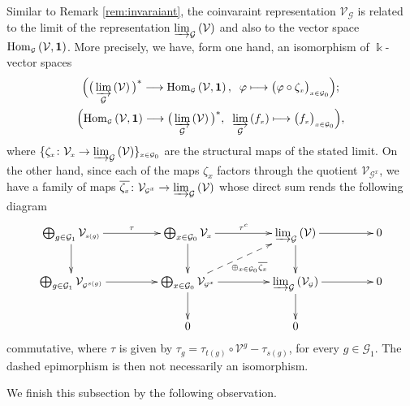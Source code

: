 \documentclass[11pt]{article}
\numberwithin{equation}{section}
\renewcommand{\hom}[3]{\mathrm{Hom}_{\Sscript{#1}}\left(#2, #3\right)}
\newcommand{\bara}[1]{\overline{#1}}
\newcommand{\Go}{\cG_{\Sscript{0}}}
\newcommand{\Ga}{\cG_{\Sscript{1}}}
\newcommand{\cG}{{\mathcal G}}
\newcommand{\cV}{{\mathcal V}}
\newcommand{\Sscript}[1]{\scriptscriptstyle{#1}}
\newcommand{\injlimit}[2]{\varinjlim_{#1}\left({#2}\right)}
\begin{document}
\begin{Remark}\label{rem:coinv}Similar to Remark \ref{rem:invaraiant}, the coinvaraint representation $\cV_{\Sscript{\cG}}$ is related to the limit of the representation $\injlimit{\cG}{\cV}$ and also to the vector space
$\hom{\cG}{\cV}{\bf 1}$. More precisely, we have, form one hand, an isomorphism of $\Bbbk$-vector spaces
\begin{gather*}
\Big(\big(\injlimit{\cG}{\cV} \big)^* \longrightarrow
\hom{\cG}{\cV}{\bf 1}, \;\; \varphi \longmapsto \big( \varphi \circ
\zeta_{\Sscript{x}}\big)_{\Sscript{x \in \Go}} \Big); \\ \Big(
\hom{\cG}{\cV}{\bf 1} \longrightarrow \big(\injlimit{\cG}{\cV}
\big)^*,\;\;\injlimit{\cG}{f_{\Sscript{x}}} \longmapsto \big(
f_{\Sscript{x}}\big)_{\Sscript{x \in \Go}}\Big),
\end{gather*}
where $\{\zeta_{\Sscript{x}}\colon \cV_{\Sscript{x}} \to \injlimit{\cG}{\cV}\}_{\Sscript{x \in \Go}}$ are the structural maps of the stated limit. On the other hand, since each of the maps $\zeta_{\Sscript{x}}$ factors through the quotient $\cV_{\Sscript{\cG^x}}$, we have a family of maps $\bara{\zeta_{\Sscript{x}}}\colon \cV_{\Sscript{\cG^x}} \to \injlimit{\cG}{\cV}$ whose direct sum rends the following diagram
\begin{gather*}
\xymatrix@C=45pt{ \bigoplus_{g \in \Ga} \cV_{\Sscript{s(g)}}
\ar@{->}^-{\tau}[r] \ar@{->}^-{}[d] & \bigoplus_{x \in \Go}
\cV_{\Sscript{x}} \ar@{->}^-{\tau^{\Sscript{c}}}[r] \ar@{->}^-{}[d]
& \injlimit{\cG}{\cV} \ar@{->}^-{}[r] \ar@{->}^-{}[d] & 0 \\
\bigoplus_{g \in \Ga} \cV_{\Sscript{\cG^{s(g)}}}
\ar@{->}^-{}[r] & \bigoplus_{x \in \Go} \cV_{\Sscript{\cG^x}}
\ar@{->}^-{}[d] \ar@{-->}_-{\oplus_{\Sscript{x \in
\Go}}\bara{\zeta_{\Sscript{x}}} }[ru] \ar@{->}^-{}[r] &
\injlimit{\cG}{\cV_{\Sscript{\cG}}} \ar@{->}^-{}[d] \ar@{->}^-{}[r]
& 0 \\ & 0 & 0 & }
\end{gather*}
commutative, where $\tau$ is given by $\tau_{\Sscript{g}}=
\tau_{\Sscript{t(g)}} \circ \cV^{\Sscript{g}}-
\tau_{\Sscript{s(g)}}$, for every $g \in \Ga$. The dashed
epimorphism is then not necessarily an isomorphism.
\end{Remark}


We finish this subsection by the following observation.
\end{document}
